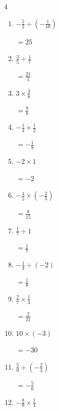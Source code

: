 \begin{multicols}{4}
\begin{enumerate}
        $\displaystyle =-\frac{1}{16}$

  \item $\displaystyle -\frac{5}{2}\div{}\left(-\frac{1}{10}\right)$

        $\displaystyle =25$

  \item $\displaystyle \frac{3}{5}\div{}\frac{1}{7}$

        $\displaystyle =\frac{21}{5}$

  \item $\displaystyle 3\times{}\frac{3}{8}$

        $\displaystyle =\frac{9}{8}$

  \item $\displaystyle -\frac{1}{4}\times{}\frac{1}{2}$

        $\displaystyle =-\frac{1}{8}$

  \item $\displaystyle -2\times{}1$

        $\displaystyle =-2$

  \item $\displaystyle -\frac{4}{5}\times{}\left(-\frac{2}{3}\right)$

        $\displaystyle =\frac{8}{15}$

  \item $\displaystyle \frac{1}{7}\div{}1$

        $\displaystyle =\frac{1}{7}$

\columnbreak %

  \item $\displaystyle -\frac{1}{4}\div{}\left(-2\right)$

        $\displaystyle =\frac{1}{8}$

  \item $\displaystyle \frac{2}{7}\times{}\frac{1}{3}$

        $\displaystyle =\frac{2}{21}$

  \item $\displaystyle 10\times{}\left(-3\right)$

        $\displaystyle =-30$

  \item $\displaystyle \frac{5}{9}\div{}\left(-\frac{2}{3}\right)$

        $\displaystyle =-\frac{5}{6}$

  \item $\displaystyle -\frac{8}{9}\times{}\frac{1}{4}$


\end{enumerate}
\end{multicols}
